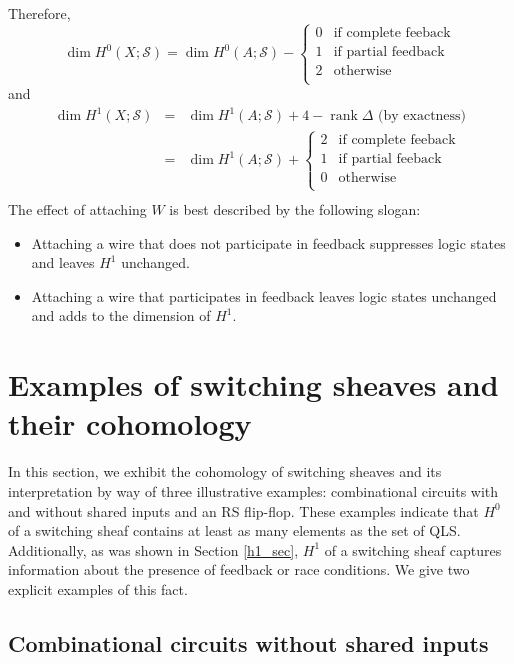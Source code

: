 \documentclass{amsart}
\theoremstyle{plain}
\theoremstyle{definition}
\def\rank{\mathop{rank}}
\begin{document}
Therefore,
\begin{equation*}
\dim H^0(X;\mathcal{S})=\dim H^0(A;\mathcal{S})-\begin{cases}
0& \text{if complete feeback}\\
1& \text{if partial feedback}\\
2& \text{otherwise}\\
\end{cases}
\end{equation*}
and
\begin{eqnarray*}
\dim H^1(X;\mathcal{S})&=&\dim H^1(A;\mathcal{S})+4-\rank \Delta \text{ (by exactness)}\\
&=&\dim H^1(A;\mathcal{S})+\begin{cases}
2& \text{if complete feeback}\\
1& \text{if partial feeback}\\
0& \text{otherwise}\\
\end{cases}\\
\end{eqnarray*}
The effect of attaching $W$ is best described by the following slogan: 
\begin{itemize}
\item Attaching a wire that does not participate in feedback suppresses logic states and leaves $H^1$ unchanged.
\item Attaching a wire that participates in feedback leaves logic states unchanged and adds to the dimension of $H^1$.
\end{itemize}

\section{Examples of switching sheaves and their cohomology}
\label{example_sec}

In this section, we exhibit the cohomology of switching sheaves and its interpretation by way of  three illustrative examples: combinational circuits with and without shared inputs and an RS flip-flop.  These examples indicate that $H^0$ of a switching sheaf contains at least as many elements as the set of QLS.  Additionally, as was shown in Section \ref{h1_sec}, $H^1$ of a switching sheaf captures information about the presence of feedback or race conditions.  We give two explicit examples of this fact.

\subsection{Combinational circuits without shared inputs}
\end{document}
